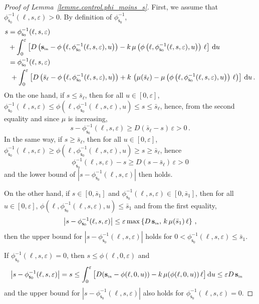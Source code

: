 \documentclass[10pt]{amsart}
\theoremstyle{definition}\newtheorem{defi}[theo]{Definition}\newtheorem{rema}[theo]{Remark}\newtheorem{exam}[theo]{Example}\newtheorem{exem}[theo]{Example}\newtheorem{nota}[theo]{Notation}
\newcommand{\Sin}{{\mathbf s}_{\textrm{\tiny\rm in}}}
\newcommand{\dif}{\mathrm{d}}
\newcommand{\barmu}{\mu(\bar s_1)}
\newcommand{\phis}{\phi_{\textsf{s}_0}^{-1}}
\newcommand{\1}{\mathbf{1}}
\begin{document}
\begin{proof}[Proof of Lemma~\ref{lemme.control.phi_moins_s}]
First, we assume that $\phis(\ell,s,\varepsilon)>0$. By definition of $\phis$,
\begin{align*}
s & = \phis(\ell,s,\varepsilon) \\
&+ \int_0^{\varepsilon}\left[D\left(\Sin-\phi\left(\ell,\phis(\ell,s,\varepsilon), u\right)\right)-k\,\mu\left(\phi\left(\ell,\phis(\ell,s,\varepsilon), u\right)\right)\,\ell\right]\,\dif u\\
& = \phis(\ell,s,\varepsilon)\\
&\; + \int_0^{\varepsilon}\left[D\left(\bar s_\ell-\phi\left(\ell,\phis(\ell,s,\varepsilon), u\right)\right)+k\,\left(\mu(\bar s_\ell)-\mu\left(\phi\left(\ell,\phis(\ell,s,\varepsilon), u\right)\right)\,\ell\right)\right]\,\dif u\,.
\end{align*}
On the one hand, if $s\leq \bar s_\ell$, then for all $u\in [0,\varepsilon]$, $\phis(\ell,s,\varepsilon)\leq \phi(\ell,\phis(\ell,s,\varepsilon), u) \leq s \leq \bar s_\ell$, hence, from the second equality and since $\mu$ is increasing,
\[
s-\phis(\ell,s,\varepsilon) \geq D(\bar s_\ell-s)\,\varepsilon>0\,.
\]
In the same way, if $s\geq \bar s_\ell$, then for all $u\in [0,\varepsilon]$, $\phis(\ell,s,\varepsilon)\geq \phi(\ell,\phis(\ell,s,\varepsilon), u) \geq s \geq \bar s_\ell$, hence
\[
\phis(\ell,s,\varepsilon) - s \geq D(s-\bar s_\ell)\,\varepsilon>0
\]
and the lower bound of $|s-\phis(\ell,s,\varepsilon)|$ then holds.

On the other hand, if $s \in [0,\bar s_1]$ and $\phis(\ell,s,\varepsilon) \in [0,\bar s_1]$, then for all $u\in[0,\varepsilon]$, $\phi(\ell,\phis(\ell,s,\varepsilon), u)\leq \bar s_1$ and from the first equality,
\[
\left|s-\phis(\ell,s,\varepsilon)\right| \leq \varepsilon \max\left\{D\,\Sin,\,k\,\barmu\,\ell\right\}\,,
\]
then the upper bound for $|s-\phis(\ell,s,\varepsilon)|$ holds for $0<\phis(\ell,s,\varepsilon)\leq \bar s_1$.

If $\phis(\ell,s,\varepsilon)=0$, then $s\leq \phi(\ell,0,\varepsilon)$ and
\begin{align*}
\left|s-\phis(\ell,s,\varepsilon)\right| =s & \leq \int_0^{\varepsilon}\big[D(\Sin-\phi(\ell,0,u))-k\,\mu(\phi(\ell,0,u))\,\ell\big]\,\dif u
\leq \varepsilon D\,\Sin
\end{align*}
and the upper bound for $|s-\phis(\ell,s,\varepsilon)| $ also holds for $\phis(\ell,s,\varepsilon)=0$.
\end{proof}
\end{document}
